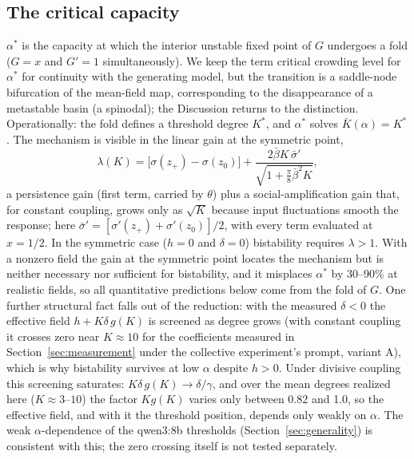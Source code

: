 \documentclass[9pt,twocolumn]{extarticle}
\newcommand{\astar}{\alpha^{*}}
\begin{document}
\subsection{The critical capacity}\label{sec:critical}

$\astar$ is the capacity at which the interior unstable fixed point of $G$
undergoes a fold ($G = x$ and $G' = 1$ simultaneously). We keep the term
critical crowding level for $\astar$ for continuity with the generating
model, but the transition is a saddle-node bifurcation of the mean-field
map, corresponding to the disappearance of a metastable basin (a spinodal);
the Discussion returns to the distinction. Operationally: the
fold defines a threshold degree $K^*$, and $\astar$ solves
$\bar K(\alpha) = K^*$. The mechanism is visible in the linear gain at the
symmetric point,
\begin{equation}
\lambda(K) = \bigl[\sigma(z_+) - \sigma(z_0)\bigr]
+ \frac{2\bar\beta K\,\bar\sigma'}{\sqrt{1 + \tfrac{\pi}{8}\bar\beta^2 K}},
\end{equation}
a persistence gain (first term, carried by $\theta$) plus a
social-amplification gain that, for constant coupling, grows only as
$\sqrt{K}$ because input fluctuations smooth the response; here
$\bar\sigma' = [\sigma'(z_+) + \sigma'(z_0)]/2$, with every term evaluated at
$x = 1/2$. In the symmetric case ($h = 0$ and $\delta = 0$) bistability requires $\lambda > 1$.
With a nonzero field the gain at the symmetric point locates the mechanism
but is neither necessary nor sufficient for bistability, and it misplaces
$\astar$ by 30--90\% at realistic fields, so all quantitative predictions
below come from the fold of $G$. One further structural fact falls out of the
reduction: with the measured $\delta < 0$ the effective field
$h + K\delta\,g(K)$ is screened as degree grows (with constant coupling it
crosses zero near $K \approx 10$ for the coefficients measured in
Section~\ref{sec:measurement} under the collective experiment's prompt,
variant A), which is why bistability survives at low $\alpha$ despite
$h > 0$. Under divisive coupling this screening saturates: $K\delta\,g(K)
\to \delta/\gamma$, and over the mean degrees realized here ($K \approx 3$--$10$)
the factor $K g(K)$ varies only between 0.82 and 1.0, so the effective field, and
with it the threshold position, depends only weakly on $\alpha$. The weak
$\alpha$-dependence of the qwen3:8b thresholds (Section~\ref{sec:generality})
is consistent with this; the zero crossing itself is not tested separately.
\end{document}
